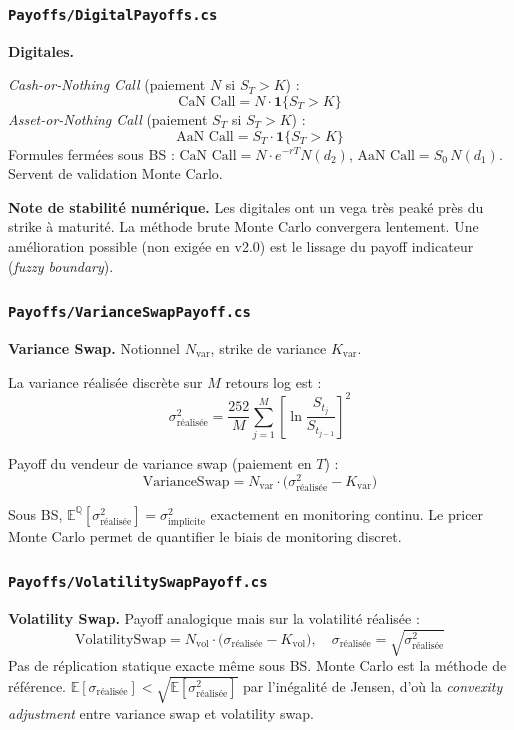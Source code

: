 \documentclass[a4paper,11pt]{article}
\begin{document}
\subsubsection{\texttt{Payoffs/DigitalPayoffs.cs}}

\begin{tcolorbox}[math]
\textbf{Digitales.}

\textit{Cash-or-Nothing Call} (paiement $N$ si $S_T > K$) :
\[
  \text{CaN Call} = N \cdot \mathbf{1}\{S_T > K\}
\]
\textit{Asset-or-Nothing Call} (paiement $S_T$ si $S_T > K$) :
\[
  \text{AaN Call} = S_T \cdot \mathbf{1}\{S_T > K\}
\]
Formules ferm\'ees sous BS : $\text{CaN Call} = N \cdot e^{-rT} N(d_2)$,
$\text{AaN Call} = S_0\, N(d_1)$. Servent de validation Monte Carlo.
\end{tcolorbox}

\textbf{Note de stabilit\'e num\'erique.} Les digitales ont un vega tr\`es peak\'e pr\`es
du strike \`a maturit\'e. La m\'ethode brute Monte Carlo convergera lentement. Une
am\'elioration possible (non exig\'ee en v2.0) est le lissage du payoff indicateur
(\textit{fuzzy boundary}).

\subsubsection{\texttt{Payoffs/VarianceSwapPayoff.cs}}

\begin{tcolorbox}[math]
\textbf{Variance Swap.} Notionnel $N_\text{var}$, strike de variance $K_\text{var}$.

La variance r\'ealis\'ee discr\`ete sur $M$ retours log est :
\[
  \sigma^2_\text{r\'ealis\'ee} = \frac{252}{M} \sum_{j=1}^{M} \left[\ln\frac{S_{t_j}}{S_{t_{j-1}}}\right]^2
\]

Payoff du vendeur de variance swap (paiement en $T$) :
\[
  \text{VarianceSwap} = N_\text{var} \cdot \bigl(\sigma^2_\text{r\'ealis\'ee} - K_\text{var}\bigr)
\]

Sous BS, $\mathbb{E}^{\mathbb{Q}}[\sigma^2_\text{r\'ealis\'ee}] = \sigma^2_\text{implicite}$
exactement en monitoring continu. Le pricer Monte Carlo permet de quantifier le biais
de monitoring discret.
\end{tcolorbox}

\subsubsection{\texttt{Payoffs/VolatilitySwapPayoff.cs}}

\begin{tcolorbox}[math]
\textbf{Volatility Swap.} Payoff analogique mais sur la volatilit\'e r\'ealis\'ee :
\[
  \text{VolatilitySwap} = N_\text{vol} \cdot \bigl(\sigma_\text{r\'ealis\'ee} - K_\text{vol}\bigr),
  \quad \sigma_\text{r\'ealis\'ee} = \sqrt{\sigma^2_\text{r\'ealis\'ee}}
\]
Pas de r\'eplication statique exacte m\^eme sous BS. Monte Carlo est la m\'ethode de
r\'ef\'erence. $\mathbb{E}[\sigma_\text{r\'ealis\'ee}] < \sqrt{\mathbb{E}[\sigma^2_\text{r\'ealis\'ee}]}$
par l'in\'egalit\'e de Jensen, d'o\`u la \textit{convexity adjustment} entre variance swap
et volatility swap.
\end{tcolorbox}
\end{document}

